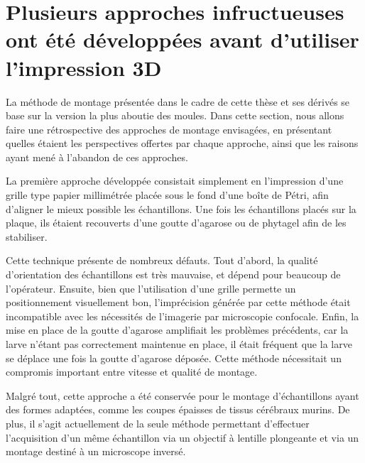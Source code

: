 \documentclass[\main/main.tex]{subfiles}
\begin{document}
    \section{Plusieurs approches infructueuses ont été développées avant d'utiliser l'impression 3D}
 
%
La méthode de montage présentée dans le cadre de cette thèse et ses dérivés se base sur la version la plus aboutie des moules.
%
Dans cette section, nous allons faire une rétrospective des approches de montage envisagées, en présentant quelles étaient les perspectives offertes par chaque approche, ainsi que les raisons ayant mené à l'abandon de ces approches.

%
La première approche développée consistait simplement en l'impression d'une grille type papier millimétrée placée sous le fond d'une boîte de Pétri, afin d'aligner le mieux possible les échantillons.
%
Une fois les échantillons placés sur la plaque, ils étaient recouverts d'une goutte d'agarose ou de phytagel afin de les stabiliser.

%
Cette technique présente de nombreux défauts. Tout d'abord, la qualité d'orientation des échantillons est très mauvaise, et dépend pour beaucoup de l'opérateur.
%
Ensuite, bien que l'utilisation d'une grille permette un positionnement visuellement bon, l'imprécision générée par cette méthode était incompatible avec les nécessités de l'imagerie par microscopie confocale.
%
Enfin, la mise en place de la goutte d'agarose amplifiait les problèmes précédents, car la larve n'étant pas correctement maintenue en place, il était fréquent que la larve se déplace une fois la goutte d'agarose déposée.
%
Cette méthode nécessitait un compromis important entre vitesse et qualité de montage.

%
Malgré tout, cette approche a été conservée pour le montage d'échantillons ayant des formes adaptées, comme les coupes épaisses de tissus cérébraux murins.
%
De plus, il s'agit actuellement de la seule méthode permettant d'effectuer l'acquisition d'un même échantillon via un objectif à lentille plongeante et via un montage destiné à un microscope inversé.
\end{document}
